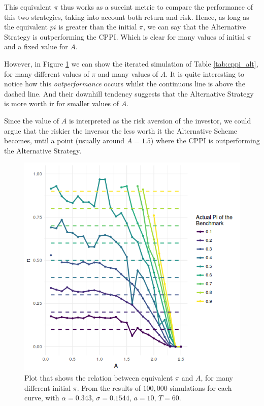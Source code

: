 This equivalent $\pi$ thus works as a succint metric to compare the performance of this two strategies, taking into account both return and risk. Hence, as long as the equivalent $pi$ is greater than the initial $\pi$, we can say that the Alternative Strategy is outperforming the CPPI. Which is clear for many values of initial $\pi$ and a fixed value for $A$.

However, in Figure \ref{fig:pi-A_all-pis} we can show the iterated simulation of Table \ref{tab:cppi_alt}, for many different values of $\pi$ and many values of $A$. It is quite interesting to notice how this \emph{outperformance} occurs whilst the continuous line is above the dashed line. And their downhill tendency suggests that the Alternative Strategy is more worth ir for smaller values of $A$.

Since the value of $A$ is interpreted as the risk aversion of the investor, we could argue that the riskier the inversor the less worth it the Alternative Scheme becomes, until a point (usually around $A = 1.5$) where the CPPI is outperforming the Alternative Strategy.


\begin{figure}[H]
    \centering
    \includegraphics[scale=0.75]{./images/pi-A-all-pis.png}
    \caption{Plot that shows the relation between equivalent $\pi$ and $A$, for many different initial $\pi$. From the results of $100,000$ simulations for each curve, with $\alpha = 0.343$, $\sigma = 0.1544$, $a = 10$, $T = 60$.}
    \label{fig:pi-A_all-pis}
\end{figure}

